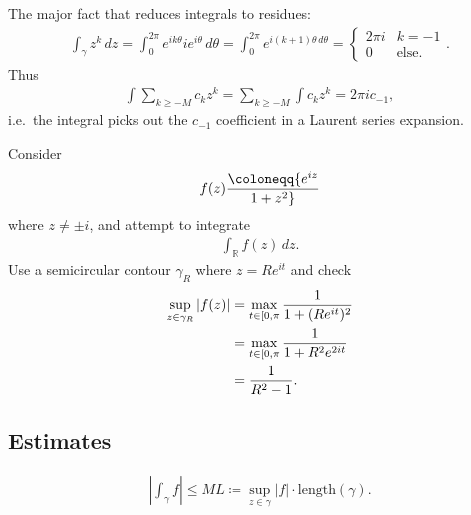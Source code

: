 \begin{fact}

The major fact that reduces integrals to residues:
\begin{align*}
\int_\gamma z^k \,dz= \int_0^{2\pi} e^{ik\theta} ie^{i\theta } \,d\theta= \int_0^{2\pi} e^{i(k+1)\theta \,d\theta}
=
\begin{cases}
2\pi i & k=-1 
\\
0 & \text{else}.
\end{cases}
.\end{align*}
Thus
\begin{align*}
\int \sum_{k\geq -M} c_k z^k = \sum_{k\geq -M} \int c_k z^k = 2\pi i c_{-1}
,\end{align*}
i.e.~the integral picks out the \(c_{-1}\) coefficient in a Laurent
series expansion.

\end{fact}

\begin{example}[?]

Consider
\begin{align*}
f(z) \coloneqq{e^{iz} \over 1 + z^2}
\end{align*}
where \(z\neq \pm i\), and attempt to integrate
\begin{align*}
\int_{\mathbb{R}}f(z) \,dz
.\end{align*}
Use a semicircular contour \(\gamma_R\) where \(z = Re^{it}\) and check
\begin{align*}
\sup_{z\in \gamma_R} {\left\lvert {f(z)} \right\rvert} 
&= \max_{t\in [0, \pi} {1 \over 1 + (Re^{it})^2 } \\
&= \max_{t\in [0, \pi} {1 \over 1 + R^2e^{2it} } \\
&= {1\over R^2 - 1}
.\end{align*}

\end{example}

\hypertarget{estimates}{%
\subsection{Estimates}\label{estimates}}

\begin{proposition}

\begin{align*}
{\left\lvert { \int_\gamma f} \right\rvert} \leq ML \coloneqq\sup_{z\in \gamma} {\left\lvert {f} \right\rvert} \cdot \mathrm{length}(\gamma)
.\end{align*}

\end{proposition}

